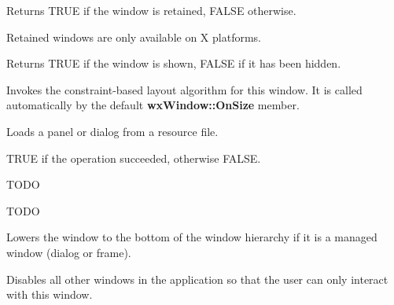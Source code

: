 Returns TRUE if the window is retained, FALSE otherwise.


Retained windows are only available on X platforms.

\label{wxwindowisshown}


Returns TRUE if the window is shown, FALSE if it has been hidden.

\label{wxwindowlayout}


Invokes the constraint-based layout algorithm for this window. It is called
automatically by the default {\bf wxWindow::OnSize} member.

\label{wxwindowloadfromresource}


Loads a panel or dialog from a resource file.






TRUE if the operation succeeded, otherwise FALSE.


TODO


TODO

\label{wxwindowlower}


Lowers the window to the bottom of the window hierarchy if it is a managed window (dialog
or frame).

\label{wxwindowmakemodal}


Disables all other windows in the application so that
the user can only interact with this window.

